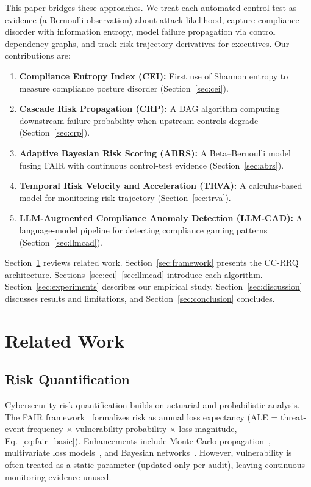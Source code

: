 \documentclass[conference]{IEEEtran}
\begin{document}
This paper bridges these approaches. We treat each automated control test as evidence (a Bernoulli observation) about attack likelihood, capture compliance disorder with information entropy, model failure propagation via control dependency graphs, and track risk trajectory derivatives for executives. Our contributions are:
\begin{enumerate}
  \item \textbf{Compliance Entropy Index (CEI):} First use of Shannon entropy to measure compliance posture disorder (Section~\ref{sec:cei}).
  \item \textbf{Cascade Risk Propagation (CRP):} A DAG algorithm computing downstream failure probability when upstream controls degrade (Section~\ref{sec:crp}).
  \item \textbf{Adaptive Bayesian Risk Scoring (ABRS):} A Beta--Bernoulli model fusing FAIR with continuous control-test evidence (Section~\ref{sec:abrs}).
  \item \textbf{Temporal Risk Velocity and Acceleration (TRVA):} A calculus-based model for monitoring risk trajectory (Section~\ref{sec:trva}).
  \item \textbf{LLM-Augmented Compliance Anomaly Detection (LLM-CAD):} A language-model pipeline for detecting compliance gaming patterns (Section~\ref{sec:llmcad}).
\end{enumerate}
Section~\ref{sec:related} reviews related work. Section~\ref{sec:framework} presents the CC-RRQ architecture. Sections~\ref{sec:cei}--\ref{sec:llmcad} introduce each algorithm. Section~\ref{sec:experiments} describes our empirical study. Section~\ref{sec:discussion} discusses results and limitations, and Section~\ref{sec:conclusion} concludes.

\section{Related Work}
\label{sec:related}

\subsection{Risk Quantification}
Cybersecurity risk quantification builds on actuarial and probabilistic analysis. The FAIR framework~\cite{Jones2005} formalizes risk as annual loss expectancy (ALE = threat-event frequency $\times$ vulnerability probability $\times$ loss magnitude, Eq.~\ref{eq:fair_basic}). Enhancements include Monte Carlo propagation~\cite{Hubbard2016}, multivariate loss models~\cite{Biener2015}, and Bayesian networks~\cite{Fielder2016,Neil2016,Poolsappasit2012}. However, vulnerability is often treated as a static parameter (updated only per audit), leaving continuous monitoring evidence unused.
\end{document}
